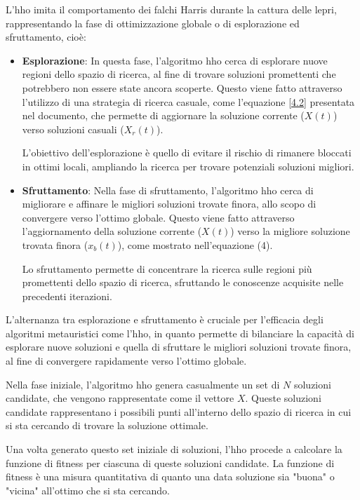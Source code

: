 L'\gls{hho} imita il comportamento dei falchi Harris durante la cattura delle lepri, rappresentando la fase di ottimizzazione globale o di esplorazione ed sfruttamento, cioè:

\begin{itemize}
      \item \textbf{Esplorazione}: In questa fase, l'algoritmo \gls{hho} cerca di esplorare nuove regioni dello spazio di ricerca, al fine di trovare soluzioni promettenti che potrebbero non essere state ancora scoperte. Questo viene fatto attraverso l'utilizzo di una strategia di ricerca casuale, come l'equazione \eqref{4.2} presentata nel documento, che permette di aggiornare la soluzione corrente ($X(t)$) verso soluzioni casuali ($X_r(t)$).

      L'obiettivo dell'esplorazione è quello di evitare il rischio di rimanere bloccati in ottimi locali, ampliando la ricerca per trovare potenziali soluzioni migliori.

      \item \textbf{Sfruttamento}: Nella fase di sfruttamento, l'algoritmo \gls{hho} cerca di migliorare e affinare le migliori soluzioni trovate finora, allo scopo di convergere verso l'ottimo globale. Questo viene fatto attraverso l'aggiornamento della soluzione corrente ($X(t)$) verso la migliore soluzione trovata finora ($x_b(t)$), come mostrato nell'equazione (4).
      
      Lo sfruttamento permette di concentrare la ricerca sulle regioni più promettenti dello spazio di ricerca, sfruttando le conoscenze acquisite nelle precedenti iterazioni. 

\end{itemize}

L'alternanza tra esplorazione e sfruttamento è cruciale per l'efficacia degli algoritmi metauristici come l'\gls{hho}, in quanto permette di bilanciare la capacità di esplorare nuove soluzioni e quella di sfruttare le migliori soluzioni trovate finora, al fine di convergere rapidamente verso l'ottimo globale.

Nella fase iniziale, l'algoritmo \gls{hho} genera casualmente un set di $N$ soluzioni candidate, che vengono rappresentate come il vettore $X$. Queste soluzioni candidate rappresentano i possibili punti all'interno dello spazio di ricerca in cui si sta cercando di trovare la soluzione ottimale.

Una volta generato questo set iniziale di soluzioni, l'\gls{hho} procede a calcolare la funzione di fitness per ciascuna di queste soluzioni candidate. La funzione di fitness è una misura quantitativa di quanto una data soluzione sia "buona" o "vicina" all'ottimo che si sta cercando.

